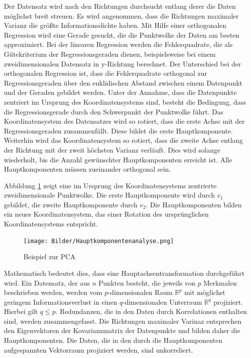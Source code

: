 Der Datensatz wird nach den Richtungen durchsucht entlang derer die Daten mög\-lichst breit streuen. Es wird angenommen, dass die Richtungen maximaler Varianz die größte Informationsdichte haben. Mit Hilfe einer orthogonalen Regression wird eine Gerade gesucht, die die Punktwolke der Daten am besten approximiert. Bei der linearen Regression werden die Fehlerquadrate, die als Gütekriterium der Regressionsgeraden dienen, beispielsweise bei einem zweidimensionalen Datensatz in y-Richtung berechnet. Der Unterschied bei der orthogonalen Regression ist, dass die Fehlerquadrate orthogonal zur Regressionsgeraden über den euklidischen Abstand zwischen einem Datenpunkt und der Geraden gebildet werden. Unter der Annahme, dass die Datenpunkte zentriert im Ursprung des Koordinatensystems sind, besteht die Bedingung, dass die Regressionsgerade durch den Schwerpunkt der Punktwolke führt. Das Koordinatensystem des Datensatzes wird so rotiert, dass die erste Achse mit der Regressionsgeraden zusammenfällt. Diese bildet die erste Hauptkomponente. Wei\-ter\-hin wird das Koordinatensystem so rotiert, dass die zweite Achse entlang der Richtung mit der zweit höchsten Varianz verläuft. Dies wird solange wiederholt, bis die Anzahl gewünschter Hauptkomponenten erreicht ist. Alle Hauptkomponenten müssen zueinander orthogonal sein.  

Abbildung \ref{fig:pca} zeigt eine im Ursprung des Koordinatensystems zentrierte zweidimensionale Punktwolke. Die erste Hauptkomponente wird durch $ v_1 $ gebildet, die zweite Hauptkomponente durch $ v_2 $. Die Hauptkomponenten bilden ein neues Koordinatensystem, das einer Rotation des ursprünglichen Koordinatensystems entspricht. 

\begin{figure}
    \centering
    \texttt{[image: Bilder/Hauptkomponentenanalyse.png]}
    \caption{Beispiel zur PCA}
    \label{fig:pca}
\end{figure}

Mathematisch bedeutet dies, dass eine Hauptachsentransformation durchgeführt wird. Ein Datensatz, der aus $ n $ Punkten besteht, die jeweils von $ p $ Merkmalen be\-schrie\-ben werden, werden vom $ p $-dimensionalen Raum $ \mathbb{R}^p $ mit möglichst geringem Informationsverlust in einen $ q $-dimensionalen Unterraum $ \mathbb{R}^q $ projiziert. Hierbei gilt $ q\leq p $. Redundanzen, die in den Daten durch Korrelationen enthalten sind, werden zusammengefasst. Die Richtungen maximaler Varinaz entsprechen den Eigenvektoren der Kovarianzmatrix der Datenpunkte und bilden daher die Hauptkomponenten. Die Daten, die in den durch die Hauptkomponenten aufgespannten Vektorraum projiziert werden, sind unkorreliert. 

